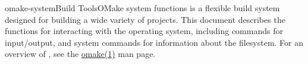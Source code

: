 %
%
%
\begin{Name}{1}{omake-system}{\authors}{Build Tools}{OMake system functions}
   is a flexible build system designed for building a wide variety of projects.
  This document describes the functions for interacting with the operating system,
  including commands for input/output, and system commands for information about
  the filesystem.
  For an overview of , see the \href{omake.html}{omake(1)} man page.
\end{Name}

